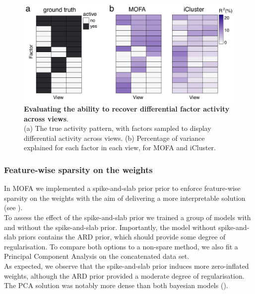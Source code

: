 \begin{figure}[H]
	\centering 	
	\includegraphics[width=1.0\textwidth]{MOFA_group_sparsity}
	\caption{\textbf{Evaluating the ability to recover differential factor activity across views}.\\
	(a) The true activity pattern, with factors sampled to display differential activity across views.
	(b) Percentage of variance explained for each factor in each view, for MOFA and iCluster\cite{Mo2013}.}
	\label{fig:MOFA_group_sparsity}
\end{figure}

\subsubsection{Feature-wise sparsity on the weights} \label{section:spike_slab}
In MOFA we implemented a spike-and-slab prior prior to enforce feature-wise sparsity on the weights with the aim of delivering a more interpretable solution (see ).\\
To assess the effect of the spike-and-slab prior we trained a group of models with and without the spike-and-slab prior. Importantly, the model without spike-and-slab priors contains the ARD prior, which should provide some degree of regularisation. To compare both options to a non-spare method, we also fit a Principal Component Analysis on the concatenated data set.\\
As expected, we observe that the spike-and-slab prior induces more zero-inflated weights, although the ARD prior provided a moderate degree of regularisation. The PCA solution was notably more dense than both bayesian models ().

